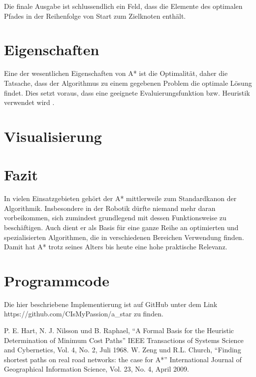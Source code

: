 \documentclass[10pt,twocolumn]{scrartcl}
\begin{document}
Die finale Ausgabe ist schlussendlich ein Feld, dass die Elemente des optimalen Pfades in der Reihenfolge von Start zum Zielknoten enthält.

\section*{Eigenschaften}

Eine der wesentlichen Eigenschaften von A* ist die Optimalität, daher die Tatsache, dass der Algorithmus zu einem gegebenen Problem die optimale Lösung findet. Dies setzt voraus, dass eine geeignete Evaluierungsfunktion bzw. Heuristik verwendet wird \cite{b1}. 




\section*{Visualisierung}

\section*{Fazit}

In vielen Einsatzgebieten gehört der A* mittlerweile zum Standardkanon der Algorithmik. Insbesondere in der Robotik dürfte niemand mehr daran vorbeikommen, sich zumindest grundlegend mit dessen Funktionsweise zu beschäftigen. Auch dient er als Basis für eine ganze Reihe an optimierten und spezialisierten Algorithmen, die in verschiedenen Bereichen Verwendung finden. Damit hat A* trotz seines Alters bis heute eine hohe praktische Relevanz.

\section*{Programmcode}

Die hier beschriebene Implementierung ist auf GitHub unter dem Link \\ https://github.com/CIsMyPassion/a\_star zu finden.



\begin{thebibliography}{99}
 P. E. Hart, N. J. Nilsson und B. Raphael, ``A Formal Basis for the Heuristic Determination of Minimum Cost Paths'' IEEE Transactions of Systems  Science and Cybernetics, Vol. 4, No. 2, Juli 1968.
 W. Zeng und R.L. Church, ``Finding shortest paths on real road networks: the case for A*'' International Journal of Geographical Information Science, Vol. 23, No. 4, April 2009.

\end{thebibliography}
\end{document}
